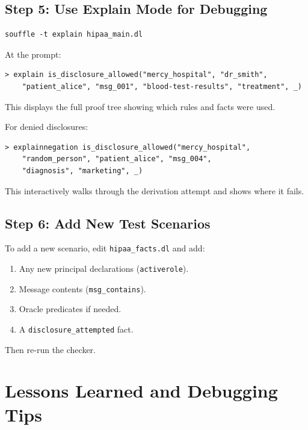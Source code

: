 \documentclass[11pt,letterpaper]{article}
\begin{document}
\subsection{Step 5: Use Explain Mode for Debugging}

\begin{lstlisting}[style=bashstyle]
souffle -t explain hipaa_main.dl
\end{lstlisting}

At the prompt:
\begin{lstlisting}[style=bashstyle]
> explain is_disclosure_allowed("mercy_hospital", "dr_smith",
    "patient_alice", "msg_001", "blood-test-results", "treatment", _)
\end{lstlisting}

This displays the full proof tree showing which rules and facts were used.

For denied disclosures:
\begin{lstlisting}[style=bashstyle]
> explainnegation is_disclosure_allowed("mercy_hospital",
    "random_person", "patient_alice", "msg_004",
    "diagnosis", "marketing", _)
\end{lstlisting}

This interactively walks through the derivation attempt and shows where it fails.

\subsection{Step 6: Add New Test Scenarios}

To add a new scenario, edit \texttt{hipaa\_facts.dl} and add:
\begin{enumerate}
  \item Any new principal declarations (\texttt{activerole}).
  \item Message contents (\texttt{msg\_contains}).
  \item Oracle predicates if needed.
  \item A \texttt{disclosure\_attempted} fact.
\end{enumerate}

Then re-run the checker.


\section{Lessons Learned and Debugging Tips}
\label{sec:lessons}
\end{document}
